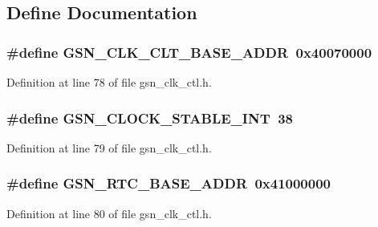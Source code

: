 \subsection{Define Documentation}
\hypertarget{a00477_aa4db632255f1ef5cbe18f32c947d868f}{
\subsubsection[{GSN\_\-CLK\_\-CLT\_\-BASE\_\-ADDR}]{\setlength{\rightskip}{0pt plus 5cm}\#define GSN\_\-CLK\_\-CLT\_\-BASE\_\-ADDR~0x40070000}}
\label{a00477_aa4db632255f1ef5cbe18f32c947d868f}


Definition at line 78 of file gsn\_\-clk\_\-ctl.h.

\hypertarget{a00477_acb6ca13b15c69b10ce12002e75a8991f}{
\subsubsection[{GSN\_\-CLOCK\_\-STABLE\_\-INT}]{\setlength{\rightskip}{0pt plus 5cm}\#define GSN\_\-CLOCK\_\-STABLE\_\-INT~38}}
\label{a00477_acb6ca13b15c69b10ce12002e75a8991f}


Definition at line 79 of file gsn\_\-clk\_\-ctl.h.

\hypertarget{a00477_a2040e61f2f25e41f8c4fd747638fecda}{
\subsubsection[{GSN\_\-RTC\_\-BASE\_\-ADDR}]{\setlength{\rightskip}{0pt plus 5cm}\#define GSN\_\-RTC\_\-BASE\_\-ADDR~0x41000000}}
\label{a00477_a2040e61f2f25e41f8c4fd747638fecda}


Definition at line 80 of file gsn\_\-clk\_\-ctl.h.



